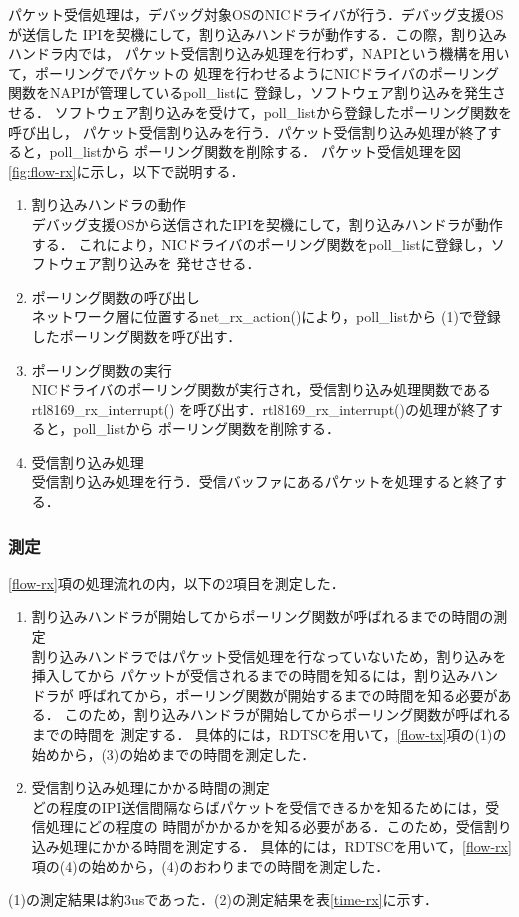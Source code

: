 \documentclass[12pt]{jsarticle}
\begin{document}
パケット受信処理は，デバッグ対象OSのNICドライバが行う．デバッグ支援OSが送信した
IPIを契機にして，割り込みハンドラが動作する．この際，割り込みハンドラ内では，
パケット受信割り込み処理を行わず，NAPIという機構を用いて，ポーリングでパケットの
処理を行わせるようにNICドライバのポーリング関数をNAPIが管理しているpoll\_listに
登録し，ソフトウェア割り込みを発生させる．
ソフトウェア割り込みを受けて，poll\_listから登録したポーリング関数を呼び出し，
パケット受信割り込みを行う．パケット受信割り込み処理が終了すると，poll\_listから
ポーリング関数を削除する．
パケット受信処理を図\ref{fig:flow-rx}に示し，以下で説明する．
\begin{enumerate}
    \item 割り込みハンドラの動作\\
        デバッグ支援OSから送信されたIPIを契機にして，割り込みハンドラが動作する．
        これにより，NICドライバのポーリング関数をpoll\_listに登録し，ソフトウェア割り込みを
        発せさせる．
    \item ポーリング関数の呼び出し\\
        ネットワーク層に位置するnet\_rx\_action()により，poll\_listから
        (1)で登録したポーリング関数を呼び出す．
    \item ポーリング関数の実行\\
        NICドライバのポーリング関数が実行され，受信割り込み処理関数であるrtl8169\_rx\_interrupt()
        を呼び出す．rtl8169\_rx\_interrupt()の処理が終了すると，poll\_listから
        ポーリング関数を削除する．
    \item 受信割り込み処理\\
        受信割り込み処理を行う．受信バッファにあるパケットを処理すると終了する．
\end{enumerate}


\subsubsection{測定}

\ref{flow-rx}項の処理流れの内，以下の2項目を測定した．
\begin{enumerate}
    \item 割り込みハンドラが開始してからポーリング関数が呼ばれるまでの時間の測定\\
        割り込みハンドラではパケット受信処理を行なっていないため，割り込みを挿入してから
        パケットが受信されるまでの時間を知るには，割り込みハンドラが
        呼ばれてから，ポーリング関数が開始するまでの時間を知る必要がある．
        このため，割り込みハンドラが開始してからポーリング関数が呼ばれるまでの時間を
        測定する．
        具体的には，RDTSCを用いて，\ref{flow-tx}項の(1)の始めから，(3)の始めまでの時間を測定した．
    \item 受信割り込み処理にかかる時間の測定\\
        どの程度のIPI送信間隔ならばパケットを受信できるかを知るためには，受信処理にどの程度の
        時間がかかるかを知る必要がある．このため，受信割り込み処理にかかる時間を測定する．
        具体的には，RDTSCを用いて，\ref{flow-rx}項の(4)の始めから，(4)のおわりまでの時間を測定した．
\end{enumerate}
(1)の測定結果は約3usであった．(2)の測定結果を表\ref{time-rx}に示す．
\end{document}
